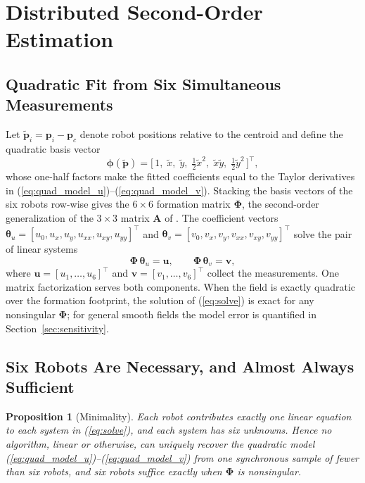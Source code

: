 \documentclass[lettersize,journal]{IEEEtran}
\newtheorem{proposition}{Proposition}
\begin{document}
\section{Distributed Second-Order Estimation}
\label{sec:estimation}

\subsection{Quadratic Fit from Six Simultaneous Measurements}

Let $\tilde{\mathbf{p}}_i = \mathbf{p}_i - \mathbf{p}_c$ denote robot
positions relative to the centroid and define the quadratic basis vector
\begin{equation}
    \boldsymbol{\phi}(\tilde{\mathbf{p}}) =
    \bigl[\,1, \; \tilde{x}, \; \tilde{y}, \; \tfrac{1}{2}\tilde{x}^2, \;
    \tilde{x}\tilde{y}, \; \tfrac{1}{2}\tilde{y}^2\,\bigr]^\top,
    \label{eq:basis}
\end{equation}
whose one-half factors make the fitted coefficients equal to the Taylor
derivatives in (\ref{eq:quad_model_u})--(\ref{eq:quad_model_v}). Stacking
the basis vectors of the six robots row-wise gives the $6 \times 6$
formation matrix $\boldsymbol{\Phi}$, the second-order generalization of
the $3 \times 3$ matrix $\mathbf{A}$ of \cite{14}. The coefficient vectors
$\boldsymbol{\theta}_u = [u_0, u_x, u_y, u_{xx}, u_{xy}, u_{yy}]^\top$ and
$\boldsymbol{\theta}_v = [v_0, v_x, v_y, v_{xx}, v_{xy}, v_{yy}]^\top$
solve the pair of linear systems
\begin{equation}
    \boldsymbol{\Phi}\,\boldsymbol{\theta}_u = \mathbf{u}, \qquad
    \boldsymbol{\Phi}\,\boldsymbol{\theta}_v = \mathbf{v},
    \label{eq:solve}
\end{equation}
where $\mathbf{u} = [u_1, \ldots, u_6]^\top$ and $\mathbf{v} = [v_1,
\ldots, v_6]^\top$ collect the measurements. One matrix factorization
serves both components. When the field is exactly quadratic over the
formation footprint, the solution of (\ref{eq:solve}) is exact for any
nonsingular $\boldsymbol{\Phi}$; for general smooth fields the model
error is quantified in Section~\ref{sec:sensitivity}.

\subsection{Six Robots Are Necessary, and Almost Always Sufficient}

\begin{proposition}[Minimality]
\label{prop:minimality}
Each robot contributes exactly one linear equation to each system in
(\ref{eq:solve}), and each system has six unknowns. Hence no algorithm,
linear or otherwise, can uniquely recover the quadratic model
(\ref{eq:quad_model_u})--(\ref{eq:quad_model_v}) from one synchronous
sample of fewer than six robots, and six robots suffice exactly when
$\boldsymbol{\Phi}$ is nonsingular.
\end{proposition}
\end{document}
